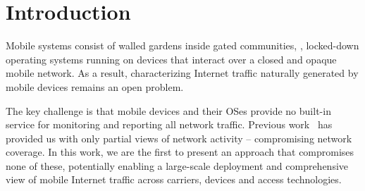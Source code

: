\section{Introduction}
\label{sec:introduction}


Mobile systems consist of walled gardens inside gated communities, \ie{}, locked-down operating 
systems running on devices that interact over a closed and opaque mobile network. As a result, 
characterizing Internet traffic naturally generated by mobile devices remains an open problem. 

The key challenge is that mobile devices and their OSes provide no built-in service for monitoring and 
reporting all network traffic. Previous work~\cite{anyattstudy, wifistudy,mobilelab,mobiperf} has provided us with only partial views of network activity 
-- compromising network coverage. In this work, we are the first to present an approach that compromises 
none of these, potentially enabling a large-scale deployment and comprehensive view of 
mobile Internet traffic across carriers, devices and access 
technologies.



